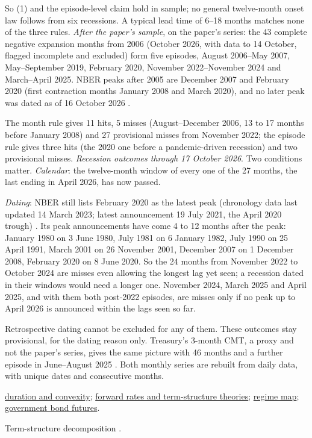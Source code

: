 \begin{qfmethod}
So (1) and the episode-level claim hold in sample; no general twelve-month onset law follows from six recessions. A typical lead time of 6--18 months matches none of the three rules. \emph{After the paper's sample}, on the paper's series: the 43 complete negative expansion months from 2006 (October 2026, with data to 14 October, flagged incomplete and excluded) form five episodes, August 2006--May 2007, May--September 2019, February 2020, November 2022--November 2024 and March--April 2025. NBER peaks after 2005 are December 2007 and February 2020 (first contraction months January 2008 and March 2020), and no later peak was dated as of 16 October 2026 \citep[chronology table and dating page]{nber-business-cycles}.

The month rule gives 11 hits, 5 misses (August--December 2006, 13 to 17 months before January 2008) and 27 provisional misses from November 2022; the episode rule gives three hits (the 2020 one before a pandemic-driven recession) and two provisional misses. \emph{Recession outcomes through 17 October 2026}. Two conditions matter. \emph{Calendar}: the twelve-month window of every one of the 27 months, the last ending in April 2026, has now passed.

\emph{Dating}: NBER still lists February 2020 as the latest peak (chronology data last updated 14 March 2023; latest announcement 19 July 2021, the April 2020 trough) \citep[chronology table and announcements page]{nber-business-cycles}. Its peak announcements have come 4 to 12 months after the peak: January 1980 on 3 June 1980, July 1981 on 6 January 1982, July 1990 on 25 April 1991, March 2001 on 26 November 2001, December 2007 on 1 December 2008, February 2020 on 8 June 2020. So the 24 months from November 2022 to October 2024 are misses even allowing the longest lag yet seen; a recession dated in their windows would need a longer one. November 2024, March 2025 and April 2025, and with them both post-2022 episodes, are misses only if no peak up to April 2026 is announced within the lags seen so far.

Retrospective dating cannot be excluded for any of them. These outcomes stay provisional, for the dating reason only. Treasury's 3-month CMT, a proxy and not the paper's series, gives the same picture with 46 months and a further episode in June--August 2025 \citep[daily CSV files]{ust-par-yield-curve}. Both monthly series are rebuilt from daily data, with unique dates and consecutive months.

 \hyperref[mod:duration-convexity]{duration and convexity}; \hyperref[mod:forward-rates-fra]{forward rates and term-structure theories}; \hyperref[def:macro-regime-asset-map]{regime map}; \hyperref[conv:government-bond-futures]{government bond futures}.

 Term-structure decomposition \citep{rt-gurkaynak-wright-2012}.

\end{qfmethod}
